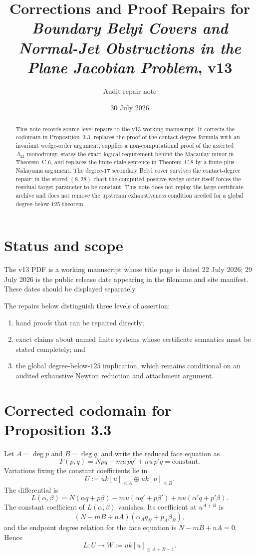 \documentclass[11pt]{article}
\title{Corrections and Proof Repairs for\\
\emph{Boundary Belyi Covers and Normal-Jet Obstructions in the Plane Jacobian Problem}, v13}
\author{Audit repair note}
\date{30 July 2026}
\begin{document}
\maketitle

\begin{abstract}
This note records source-level repairs to the v13 working manuscript.  It
corrects the codomain in Proposition~3.3, replaces the proof of the
contact-degree formula with an invariant wedge-order argument, supplies a
non-computational proof of the asserted $A_{21}$ monodromy, states the exact
logical requirement behind the Macaulay minor in Theorem~C.6, and replaces
the finite-etale sentence in Theorem~C.8 by a finite-plus-Nakayama argument.
The degree-$17$ secondary Belyi cover survives the contact-degree repair:
in the stored $(8,28)$ chart the computed positive wedge order itself forces
the residual target parameter to be constant.  This note does not replay the
large certificate archive and does not remove the upstream exhaustiveness
condition needed for a global degree-below-$125$ theorem.
\end{abstract}

\section{Status and scope}

The v13 PDF is a working manuscript whose title page is dated 22 July 2026;
29 July 2026 is the public release date appearing in the filename and site
manifest.  These dates should be displayed separately.

The repairs below distinguish three levels of assertion:
\begin{enumerate}[label=(\roman*)]
  \item hand proofs that can be repaired directly;
  \item exact claims about named finite systems whose certificate semantics
        must be stated completely; and
  \item the global degree-below-$125$ implication, which remains conditional
        on an audited exhaustive Newton reduction and attachment argument.
\end{enumerate}

\section{Corrected codomain for Proposition 3.3}

Let $A=\deg p$ and $B=\deg q$, and write the reduced face equation as
\[
 F(p,q)=Npq-m u\,p q'+n u\,p'q=\text{constant}.
\]
Variations fixing the constant coefficients lie in
\[
 U:=u k[u]_{\le A}\oplus u k[u]_{\le B}.
\]
The differential is
\[
 L(\alpha,\beta)=N(\alpha q+p\beta)
 -m u(\alpha q'+p\beta')+n u(\alpha' q+p'\beta).
\]
The constant coefficient of $L(\alpha,\beta)$ vanishes.  Its coefficient at
$u^{A+B}$ is
\[
 (N-mB+nA)(\alpha_Aq_B+p_A\beta_B),
\]
and the endpoint degree relation for the face equation is
$N-mB+nA=0$.  Hence
\[
 L:U\longrightarrow W:=u k[u]_{\le A+B-1}.
\]
\end{document}
